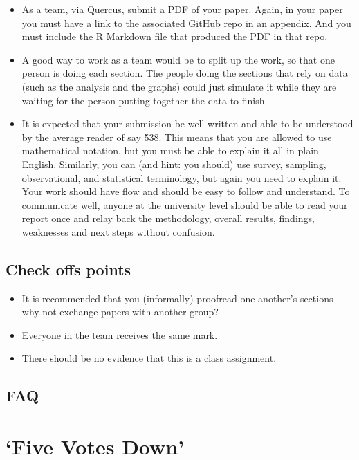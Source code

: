 \documentclass[
]{book}
\providecommand{\tightlist}{%
  \setlength{\itemsep}{0pt}\setlength{\parskip}{0pt}}
\begin{document}
\begin{itemize}
\item
  As a team, via Quercus, submit a PDF of your paper. Again, in your paper you must have a link to the associated GitHub repo in an appendix. And you must include the R Markdown file that produced the PDF in that repo.
\item
  A good way to work as a team would be to split up the work, so that one person is doing each section. The people doing the sections that rely on data (such as the analysis and the graphs) could just simulate it while they are waiting for the person putting together the data to finish.
\item
  It is expected that your submission be well written and able to be understood by the average reader of say 538. This means that you are allowed to use mathematical notation, but you must be able to explain it all in plain English. Similarly, you can (and hint: you should) use survey, sampling, observational, and statistical terminology, but again you need to explain it. Your work should have flow and should be easy to follow and understand. To communicate well, anyone at the university level should be able to read your report once and relay back the methodology, overall results, findings, weaknesses and next steps without confusion.
\end{itemize}

\hypertarget{check-offs-points-5}{%
\subsection{Check offs points}\label{check-offs-points-5}}

\begin{itemize}
\tightlist
\item
  It is recommended that you (informally) proofread one another's sections - why not exchange papers with another group?
\item
  Everyone in the team receives the same mark.
\item
  There should be no evidence that this is a class assignment.
\end{itemize}

\hypertarget{faq-5}{%
\subsection{FAQ}\label{faq-5}}

\hypertarget{five-votes-down}{%
\section{`Five Votes Down'}\label{five-votes-down}}
\end{document}
